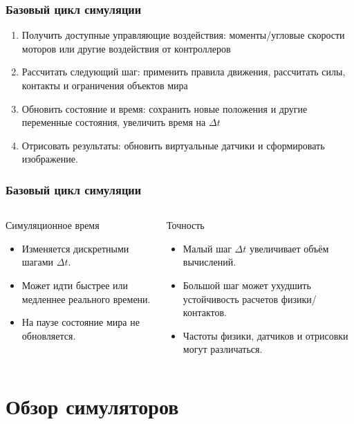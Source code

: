 \documentclass[aspectratio=169]{beamer}
\begin{document}
\begin{frame}
\frametitle{Базовый цикл симуляции}
\begin{enumerate}
  \item Получить доступные управляющие воздействия: моменты/угловые скорости моторов или другие воздействия от контроллеров 
  \item Рассчитать следующий шаг: применить правила движения, рассчитать силы, контакты и ограничения объектов мира
  \item Обновить состояние и время: сохранить новые положения и другие переменные состояния, увеличить время на $\Delta t$
  \item Отрисовать результаты: обновить виртуальные датчики и сформировать изображение.
\end{enumerate}
\end{frame}

\begin{frame}
\frametitle{Базовый цикл симуляции}
\begin{columns}[T]
\begin{block}{Симуляционное время}
\begin{itemize}
  \item Изменяется дискретными шагами $\Delta t$.
  \item Может идти быстрее или медленнее реального времени.
  \item На паузе состояние мира не обновляется.
\end{itemize}
\end{block}
\begin{block}{Точность}
\begin{itemize}
  \item Малый шаг $\Delta t$ увеличивает объём вычислений.
  \item Большой шаг может ухудшить устойчивость расчетов физики/контактов.
  \item Частоты физики, датчиков и отрисовки могут различаться.
\end{itemize}
\end{block}
\end{columns}
\end{frame}

\section{Обзор симуляторов}
\end{document}
